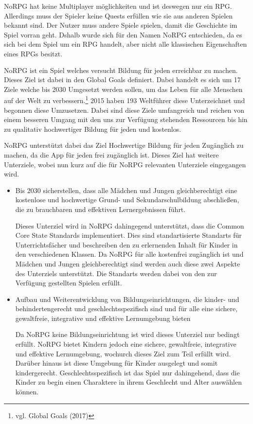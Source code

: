 NoRPG hat keine Multiplayer möglichkeiten und ist deswegen nur ein RPG. Allerdings muss der Spieler keine Quests erfüllen wie sie aus anderen Spielen bekannt sind. Der Nutzer muss andere Spiele spielen, damit die Geschichte im Spiel vorran geht. Dshalb wurde sich für den Namen NoRPG entschieden, da es sich bei dem Spiel um ein RPG handelt, aber nicht alle klassischen Eigenschaften eines RPGs besitzt.
	
NoRPG ist ein Spiel welches versucht Bildung für jeden erreichbar zu machen. Dieses Ziel ist dabei in den Global Goals definiert. Dabei handelt es sich um 17 Ziele welche bis 2030 Umgesetzt werden sollen, um das Leben für alle Menschen auf der Welt zu verbessern.\footnote{vgl. Global Goals \cite{global} (2017)} 2015 haben 193 Weltführer diese Unterzeichnet und begonnen diese Umzusetzen. Dabei sind diese Ziele umfangreich und reichen von einem besseren Umgang mit den uns zur Verfügung stehenden Ressourcen bis hin zu qualitativ hochwertiger Bildung für jeden und kostenlos.

NoRPG unterstützt dabei das Ziel Hochwertige Bildung für jeden Zugänglich zu machen, da die App für jeden frei zugänglich ist. Dieses Ziel hat weitere Unterziele, wobei nun kurz auf die für NoRPG relevanten Unterziele eingegangen wird.

\begin{itemize}
\item Bis 2030 sicherstellen, dass alle Mädchen und Jungen gleichberechtigt eine kostenlose und hochwertige Grund- und Sekundarschulbildung abschließen, die zu brauchbaren und effektiven Lernergebnissen führt.

Dieses Unterziel wird in NoRPG dahingegend unterstützt, dass die Common Core State Standards implementiert. Dies sind standartisierte Standarts für Unterrichtsfächer und beschreiben den zu erlernenden Inhalt für Kinder in den verschiedenen Klassen. Da NoRPG für alle kostenfrei zugänglich ist und Mädchen und Jungen gleichberechtigt sind werden auch diese zwei Aspekte des Unterziels unterstützt. Die Standarts werden dabei von den zur Verfügung gestellten Spielen erfüllt.

\item Aufbau und Weiterentwicklung von Bildungseinrichtungen, die kinder- und behindertengerecht und geschlechtsspezifisch sind und für alle eine sichere, gewaltfreie, integrative und effektive Lernumgebung bieten

Da NoRPG keine Bildungseinrichtung ist wird dieses Unterziel nur bedingt erfüllt. NoRPG bietet Kindern jedoch eine sichere, gewaltfreie, integrative und effektive Lernumgebung, wochurch dieses Ziel zum Teil erfüllt wird. Darüber hinaus ist diese Umgebung für Kinder ausgelegt und somit kindergerecht. Geschlechtsspezifisch ist das Spiel nur dahingehend, dass die Kinder zu begin einen Charaktere in ihrem Geschlecht und Alter auswählen können.

\end{itemize}


